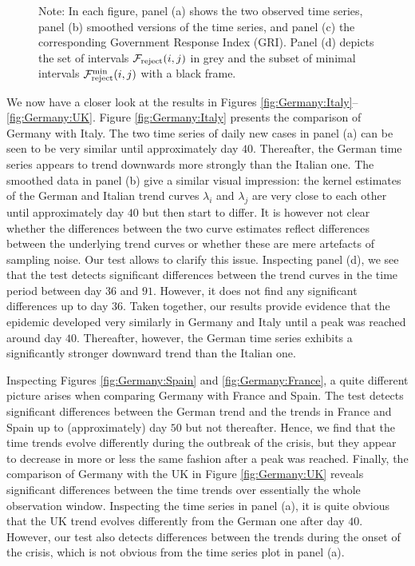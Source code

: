 \documentclass[a4paper,12pt]{article}
\numberwithin{equation}{section}
\begin{document}
\begin{figure}[p!]
\caption*{Note: In each figure, panel (a) shows the two observed time series, panel (b) smoothed versions of the time series, and panel (c) the corresponding Government Response Index (GRI). Panel (d) depicts the set of intervals $\mathcal{F}_{\text{reject}}(i,j)$ in grey and the subset of minimal intervals $\mathcal{F}_{\text{reject}}^{\text{min}}(i,j)$ with a black frame.}
\end{figure}


We now have a closer look at the results in Figures \ref{fig:Germany:Italy}--\ref{fig:Germany:UK}. Figure \ref{fig:Germany:Italy} presents the comparison of Germany with Italy. The two time series of daily new cases in panel (a) can be seen to be very similar until approximately day $40$. Thereafter, the German time series appears to trend downwards more strongly than the Italian one. The smoothed data in panel (b) give a similar visual impression: the kernel estimates of the German and Italian trend curves $\lambda_i$ and $\lambda_j$ are very close to each other until approximately day $40$ but then start to differ. It is however not clear whether the differences between the two curve estimates reflect differences between the underlying trend curves or whether these are mere artefacts of sampling noise. Our test allows to clarify this issue. Inspecting panel (d), we see that the test detects significant differences between the trend curves in the time period between day $36$ and $91$. However, it does not find any significant differences up to day $36$. 
Taken together, our results provide evidence that the epidemic developed very similarly in Germany and Italy until a peak was reached around day $40$. Thereafter, however, the German time series exhibits a significantly stronger downward trend than the Italian one. 


Inspecting Figures \ref{fig:Germany:Spain} and  \ref{fig:Germany:France}, a quite different picture arises when comparing Germany with France and Spain. The test detects significant differences between the German trend and the trends in France and Spain up to (approximately) day $50$ but not thereafter. Hence, we find that the time trends evolve differently during the outbreak of the crisis, but they appear to decrease in more or less the same fashion after a peak was reached. Finally, the comparison of Germany with the UK in Figure \ref{fig:Germany:UK} reveals significant differences between the time trends over essentially the whole observation window. Inspecting the time series in panel (a), it is quite obvious that the UK trend evolves differently from the German one after day $40$. However, our test also detects differences between the trends during the onset of the crisis, which is not obvious from the time series plot in panel (a). 
\end{document}
